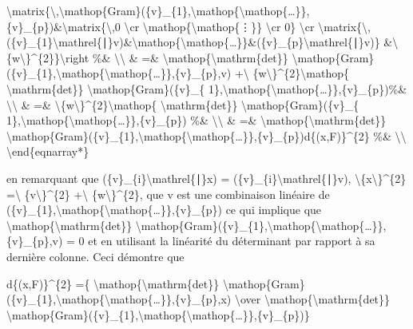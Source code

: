 \documentclass[]{article}
\begin{document}
\textbar{}\textbackslash{}matrix\{\textbackslash{},\textbackslash{}mathop\{Gram\}(\{v\}\_\{1\},\textbackslash{}mathop\{\textbackslash{}mathop\{\ldots{}\}\},\{v\}\_\{p\})\&\textbackslash{}matrix\{\textbackslash{},0
\textbackslash{}cr \textbackslash{}mathop\{\textbackslash{}mathop\{⋮\}\}
\textbackslash{}cr 0\} \textbackslash{}cr
\textbackslash{}matrix\{\textbackslash{},(\{v\}\_\{1\}\textbackslash{}mathrel\{∣\}v)\&\textbackslash{}mathop\{\textbackslash{}mathop\{\ldots{}\}\}\&(\{v\}\_\{p\}\textbackslash{}mathrel\{∣\}v)\}
\&\textbackslash{}\textbar{}\{w\textbackslash{}\textbar{}\}\^{}\{2\}\}\textbackslash{}right
\textbar{} \%\& \textbackslash{}\textbackslash{} \& =\&
\textbackslash{}mathop\{\textbackslash{}mathrm\{det\}\}
\textbackslash{}mathop\{Gram\}(\{v\}\_\{1\},\textbackslash{}mathop\{\textbackslash{}mathop\{\ldots{}\}\},\{v\}\_\{p\},v)
+\textbackslash{}\textbar{}
\{w\textbackslash{}\textbar{}\}\^{}\{2\}\textbackslash{}mathop\{
\textbackslash{}mathrm\{det\}\} \textbackslash{}mathop\{Gram\}(\{v\}\_\{
1\},\textbackslash{}mathop\{\textbackslash{}mathop\{\ldots{}\}\},\{v\}\_\{p\})\%\&
\textbackslash{}\textbackslash{} \& =\&
\textbackslash{}\textbar{}\{w\textbackslash{}\textbar{}\}\^{}\{2\}\textbackslash{}mathop\{
\textbackslash{}mathrm\{det\}\} \textbackslash{}mathop\{Gram\}(\{v\}\_\{
1\},\textbackslash{}mathop\{\textbackslash{}mathop\{\ldots{}\}\},\{v\}\_\{p\})
\%\& \textbackslash{}\textbackslash{} \& =\&
\textbackslash{}mathop\{\textbackslash{}mathrm\{det\}\}
\textbackslash{}mathop\{Gram\}(\{v\}\_\{1\},\textbackslash{}mathop\{\textbackslash{}mathop\{\ldots{}\}\},\{v\}\_\{p\})d\{(x,F)\}\^{}\{2\}
\%\& \textbackslash{}\textbackslash{} \textbackslash{}end\{eqnarray*\}

en remarquant que (\{v\}\_\{i\}\textbackslash{}mathrel\{∣\}x) =
(\{v\}\_\{i\}\textbackslash{}mathrel\{∣\}v),
\textbackslash{}\textbar{}\{x\textbackslash{}\textbar{}\}\^{}\{2\}
=\textbackslash{}\textbar{} \{v\textbackslash{}\textbar{}\}\^{}\{2\}
+\textbackslash{}\textbar{} \{w\textbackslash{}\textbar{}\}\^{}\{2\},
que v est une combinaison linéaire de
(\{v\}\_\{1\},\textbackslash{}mathop\{\textbackslash{}mathop\{\ldots{}\}\},\{v\}\_\{p\})
ce qui implique que
\textbackslash{}mathop\{\textbackslash{}mathrm\{det\}\}
\textbackslash{}mathop\{Gram\}(\{v\}\_\{1\},\textbackslash{}mathop\{\textbackslash{}mathop\{\ldots{}\}\},\{v\}\_\{p\},v)
= 0 et en utilisant la linéarité du déterminant par rapport à sa
dernière colonne. Ceci démontre que

d\{(x,F)\}\^{}\{2\} =\{
\textbackslash{}mathop\{\textbackslash{}mathrm\{det\}\}
\textbackslash{}mathop\{Gram\}(\{v\}\_\{1\},\textbackslash{}mathop\{\textbackslash{}mathop\{\ldots{}\}\},\{v\}\_\{p\},x)
\textbackslash{}over
\textbackslash{}mathop\{\textbackslash{}mathrm\{det\}\}
\textbackslash{}mathop\{Gram\}(\{v\}\_\{1\},\textbackslash{}mathop\{\textbackslash{}mathop\{\ldots{}\}\},\{v\}\_\{p\})\}
\end{document}
